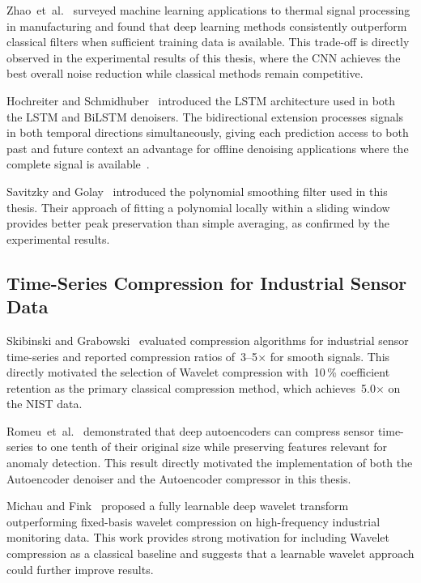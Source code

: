 Zhao~et~al.~\cite{ml_thermal_processing} surveyed machine learning applications to thermal signal processing in manufacturing and found that deep learning methods consistently outperform classical filters when sufficient training data is available. This trade-off is directly observed in the experimental results of this thesis, where the CNN achieves the best overall noise reduction while classical methods remain competitive.

Hochreiter and Schmidhuber~\cite{hochreiter1997long} introduced the LSTM architecture used in both the LSTM and BiLSTM denoisers. The bidirectional extension processes signals in both temporal directions simultaneously, giving each prediction access to both past and future context  an advantage for offline denoising applications where the complete signal is available~\cite{schmidhuber2015deep}.

Savitzky and Golay~\cite{savitzky1964smoothing} introduced the polynomial smoothing filter used in this thesis. Their approach of fitting a polynomial locally within a sliding window provides better peak preservation than simple averaging, as confirmed by the experimental results.

\subsection{Time-Series Compression for Industrial Sensor Data}

Skibinski and Grabowski~\cite{lossless_compression} evaluated compression algorithms for industrial sensor time-series and reported compression ratios of~3--5$\times$ for smooth signals. This directly motivated the selection of Wavelet compression with~10\,\% coefficient retention as the primary classical compression method, which achieves~5.0$\times$ on the NIST data.

Romeu~et~al.~\cite{autoencoder_compression} demonstrated that deep autoencoders can compress sensor time-series to one tenth of their original size while preserving features relevant for anomaly detection. This result directly motivated the implementation of both the Autoencoder denoiser and the Autoencoder compressor in this thesis.

Michau and Fink~\cite{learnable_wavelet} proposed a fully learnable deep wavelet transform outperforming fixed-basis wavelet compression on high-frequency industrial monitoring data. This work provides strong motivation for including Wavelet compression as a classical baseline and suggests that a learnable wavelet approach could further improve results.


